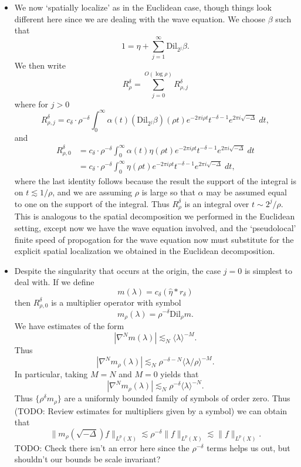\begin{itemize}
    \item We now `spatially localize' as in the Euclidean case, though things look different here since we are dealing with the wave equation. We choose $\beta$ such that
    \[ 1 = \eta + \sum_{j = 1}^\infty \text{Dil}_{2^j} \beta. \]
    We then write
    \[ R^\delta_{\rho} = \sum_{j = 0}^{O(\log \rho)} R^\delta_{\rho,j} \]
    where for $j > 0$
    \[ R^\delta_{\rho,j} = c_\delta \cdot \rho^{-\delta} \int_0^\infty \alpha(t) (\text{Dil}_{2^j} \beta)(\rho t) e^{- 2 \pi i \rho t} t^{-\delta - 1} e^{2 \pi i \sqrt{-\Delta}}\; dt, \]
    and
    \begin{align*}
        R^\delta_{\rho,0} &= c_\delta \cdot \rho^{-\delta} \int_0^\infty \alpha(t) \eta(\rho t) e^{-2 \pi i \rho t} t^{-\delta - 1} e^{2 \pi i \sqrt{-\Delta}}\; dt\\
        &= c_\delta \cdot \rho^{-\delta} \int_0^\infty \eta(\rho t) e^{-2 \pi i \rho t} t^{-\delta - 1} e^{2 \pi i \sqrt{-\Delta}}\; dt,
    \end{align*}
    where the last identity follows because the result the support of the integral is on $t \lesssim 1/\rho$, and we are assuming $\rho$ is large so that $\alpha$ may be assumed equal to one on the support of the integral. Thus $R^\delta_\rho$ is an integral over $t \sim 2^j / \rho$. This is analogous to the spatial decomposition we performed in the Euclidean setting, except now we have the wave equation involved, and the `pseudolocal' finite speed of propogation for the wave equation now must substitute for the explicit spatial localization we obtained in the Euclidean decomposition.

    \item Despite the singularity that occurs at the origin, the case $j = 0$ is simplest to deal with. If we define
    \[ m(\lambda) = c_\delta (\widehat{\eta} * r_\delta) \]
    then $R^\delta_{\rho,0}$ is a multiplier operator with symbol
    \[ m_\rho(\lambda) = \rho^{-\delta} \text{Dil}_\rho m. \]
    We have estimates of the form
    \[ | \nabla^N m(\lambda) | \lesssim_N \langle \lambda \rangle^{-M}. \]
    Thus
    \[ | \nabla^N m_\rho(\lambda)| \lesssim_N \rho^{-\delta-N} \langle \lambda / \rho \rangle^{-M}. \]
    In particular, taking $M = N$ and $M = 0$ yields that
    \[ | \nabla^N m_\rho(\lambda)| \lesssim_N \rho^{-\delta} \langle \lambda \rangle^{-N}. \]
    Thus  $\{ \rho^\delta m_\rho \}$ are a uniformly bounded family of symbols of order zero. Thus (TODO: Review estimates for multipliers given by a symbol) we can obtain that
    \[ \| m_\rho(\sqrt{-\Delta}) f \|_{L^p(X)} \lesssim \rho^{-\delta} \| f \|_{L^p(X)} \lesssim \| f \|_{L^p(X)}. \]
    TODO: Check there isn't an error here since the $\rho^{-\delta}$ terms helps us out, but shouldn't our bounds be scale invariant?


\end{itemize}
